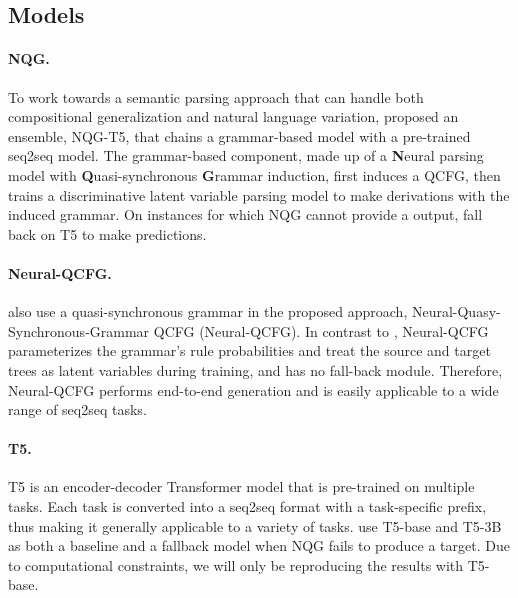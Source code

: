 \subsection{Models}
\paragraph{NQG.}
To work towards a semantic parsing approach that can handle both compositional generalization and natural language variation, \citet{shaw-etal-2021-compositional} proposed an ensemble, NQG-T5, that chains a grammar-based model with a pre-trained seq2seq model.
The grammar-based component, made up of a \textbf{N}eural parsing model with \textbf{Q}uasi-synchronous \textbf{G}rammar induction, first induces a QCFG, then trains a discriminative latent variable parsing model to make derivations with the induced grammar. 
On instances for which NQG cannot provide a output, \citet{shaw-etal-2021-compositional} fall back on T5 \cite{raffel2020exploring} to make predictions.

\vspace{-3mm}
\paragraph{Neural-QCFG.}
\citet{kim2021sequencetosequence} also use a quasi-synchronous grammar in the proposed approach, Neural-Quasy-Synchronous-Grammar QCFG (Neural-QCFG).
In contrast to \cite{shaw-etal-2021-compositional}, Neural-QCFG parameterizes the grammar's rule probabilities and treat the source and target trees as latent variables during training, and has no fall-back module.
Therefore, Neural-QCFG performs end-to-end generation and is easily applicable to a wide range of seq2seq tasks.

\vspace{-3mm}
\paragraph{T5.}
T5 \cite{raffel2020exploring} is an encoder-decoder Transformer \cite{vaswani2017attention} model that is pre-trained on multiple tasks. 
Each task is converted into a seq2seq format with a task-specific prefix, thus making it generally applicable to a variety of tasks.
\cite{shaw-etal-2021-compositional} use T5-base and T5-3B as both a baseline and a fallback model when NQG fails to produce a target.
Due to computational constraints, we will only be reproducing the results with T5-base.

